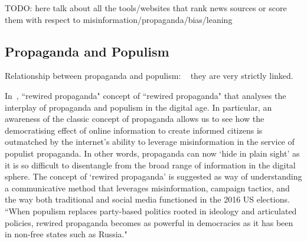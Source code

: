 TODO: here talk about all the tools/websites that rank news sources or score them with respect to misinformation/propaganda/bias/leaning

\subsection{Propaganda and Populism}
\label{sec:lit_related_populism}

Relationship between propaganda and populism:
~\cite{oates2021rewired,tumber2021routledge,pasquino2008populism}
they are very strictly linked.

In~\citet{oates2021rewired}, ``rewired propaganda"
concept of ``rewired propaganda" that analyses the interplay of propaganda and populism in the digital age. In particular, an awareness of the classic concept of propaganda allows us to see how the democratising effect of online information to create informed citizens is outmatched by the internet’s ability to leverage misinformation in the service of populist propaganda.
In other words, propaganda can now ‘hide in plain sight’ as it is so difficult to disentangle from the broad range of information in the digital sphere.
The concept of ‘rewired propaganda’ is suggested as way of understanding a communicative method that leverages misinformation, campaign tactics, and the way both traditional and social media functioned in the 2016 US elections.
``When populism replaces party-based politics rooted in ideology and articulated policies, rewired propaganda becomes as powerful in democracies as it has been in non-free states such as Russia."


